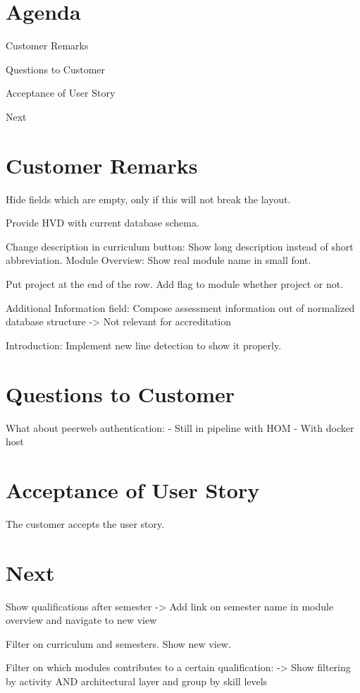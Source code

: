 \documentclass[11pt]{meetingmins}
\begin{document}
\maketitle

\section{Agenda}
\begin{hiddenitems}
	\item Customer Remarks
	\item Questions to Customer
	\item Acceptance of User Story
	\item Next
\end{hiddenitems}

\section{Customer Remarks}
Hide fields which are empty, only if this will not break the layout.

Provide HVD with current database schema.

Change description in curriculum button: Show long description instead of short abbreviation.
Module Overview: Show real module name in small font.

Put project at the end of the row. Add flag to module whether project or not.

Additional Information field: Compose assessment information out of normalized database structure
-> Not relevant for accreditation

Introduction: Implement new line detection to show it properly.


\section{Questions to Customer}
What about peerweb authentication:
- Still in pipeline with HOM
- With docker host

\section{Acceptance of User Story}

The customer accepts the user story.


\section{Next}
Show qualifications after semester
-> Add link on semester name in module overview and navigate to new view

Filter on curriculum and semesters. Show new view.


Filter on which modules contributes to a certain qualification:
-> Show filtering by activity AND architectural layer and group by skill levels
\end{document}
